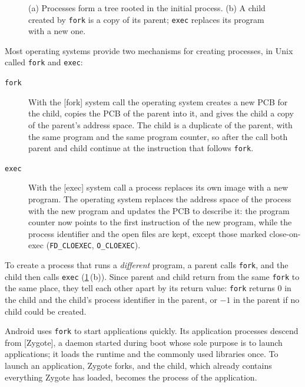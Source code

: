 \documentclass[../main.tex]{subfiles}
\begin{document}
\begin{figure}[htbp]
  \centering
  
  \caption{(a) Processes form a tree rooted in the initial process.  (b) A
    child created by \texttt{fork} is a copy of its parent; \texttt{exec}
    replaces its program with a new one.}
  \label{fig:l02-creation}
\end{figure}

Most operating systems provide two mechanisms for creating processes, in
Unix called \texttt{fork} and \texttt{exec}:
\begin{description}
  \item[\texttt{fork}] With the [fork] system
    call the operating system creates a new PCB for the child, copies the
    PCB of the parent into it, and gives the child a copy of the parent's
    address space.  The child is a duplicate of the parent, with the same
    program and the same program counter, so after the call both parent and
    child continue at the instruction that follows \texttt{fork}.
  \item[\texttt{exec}] With the [exec] system
    call a process replaces its own image with a new program.  The
    operating system replaces the address space of the process with the new
    program and updates the PCB to describe it: the program counter now
    points to the first instruction of the new program, while the process
    identifier and the open files are kept, except those marked
    close-on-exec (\texttt{FD\_CLOEXEC}, \texttt{O\_CLOEXEC}).
\end{description}


To create a process that runs a \emph{different} program, a parent calls
\texttt{fork}, and the child then calls \texttt{exec}
(\cref{fig:l02-creation}\,(b)).  Since parent and child return from the
same \texttt{fork} to the same place, they tell each other apart by its
return value: \texttt{fork} returns 0 in the child and the child's process
identifier in the parent, or $-1$ in the parent if no child could be
created.

Android uses \texttt{fork} to start applications quickly.  Its application
processes descend from [Zygote], a daemon started during boot
whose sole purpose is to launch applications; it loads the runtime and the
commonly used libraries once.
To launch an application, Zygote forks, and the child, which already
contains everything Zygote has loaded, becomes the process of the
application.
\end{document}
